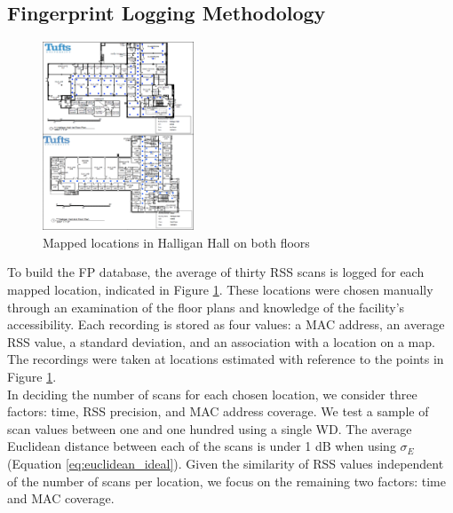 \documentclass[conference]{IEEEtran}
\begin{document}
\subsection{Fingerprint Logging Methodology}

\begin{figure}[t!] 
  \centering
    \includegraphics[width=0.4\textwidth]{FloorsImproved.png}
     \caption{Mapped locations in Halligan Hall on both floors}
     \label{fig:mapped_positions}
\end{figure}


To build the FP database, the average of thirty RSS scans is logged for each mapped location, indicated in Figure \ref{fig:mapped_positions}. These locations were chosen manually through an examination of the floor plans and knowledge of the facility's accessibility. Each recording is stored as four values: a MAC address, an average RSS value, a standard deviation, and an association with a location on a map. The recordings were taken at locations estimated with reference to the points in Figure \ref{fig:mapped_positions}.\\
\indent In deciding the number of scans for each chosen location, we consider three factors: time, RSS precision, and MAC address coverage. We test a sample of scan values between one and one hundred using a single WD. The average Euclidean distance between each of the scans is under 1 dB when using $\sigma_E$ (Equation \ref{eq:euclidean_ideal}). Given the similarity of RSS values independent of the number of scans per location, we focus on the remaining two factors: time and MAC coverage. 


\begin{table}[!t]
\renewcommand{\arraystretch}{1.3}
\caption{Floor Recording Times (average 1.5 sec/scan)}
\label{tab:table_floor_times}
\centering
{}
\end{table}
\end{document}
